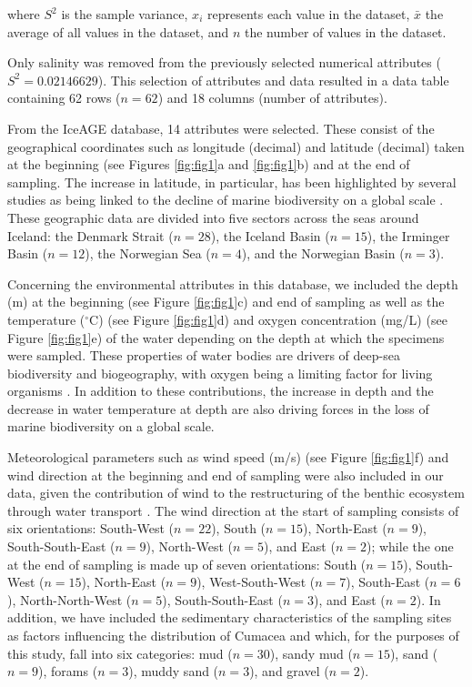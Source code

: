 where $S^2$ is the sample variance, $x_i$ represents each value in the dataset, $\bar{x}$ the average of all values in the dataset, and $n$ the number of values in the dataset.

Only salinity was removed from the previously selected numerical attributes ($S^2 = 0.02146629$). This selection of attributes and data resulted in a data table containing 62 rows ($n=62$) and 18 columns (number of attributes). 

From the IceAGE database, 14 attributes were selected. These consist of the geographical coordinates such as longitude (decimal) and latitude (decimal) taken at the beginning (see Figures \ref{fig:fig1}a and \ref{fig:fig1}b) and at the end of sampling. The increase in latitude, in particular, has been highlighted by several studies as being linked to the decline of marine biodiversity on a global scale \citep{lambshead_latitudinal_2000, gage_diversity_2004}. These geographic data are divided into five sectors across the seas around Iceland: the Denmark Strait ($n=28$), the Iceland Basin ($n=15$), the Irminger Basin ($n=12$), the Norwegian Sea ($n=4$), and the Norwegian Basin ($n=3$). 

Concerning the environmental attributes in this database, we included the depth (m) at the beginning (see Figure \ref{fig:fig1}c) and end of sampling as well as the temperature ($^\circ$C) (see Figure \ref{fig:fig1}d) and oxygen concentration (mg/L) (see Figure \ref{fig:fig1}e) of the water depending on the depth at which the specimens were sampled. These properties of water bodies are drivers of deep-sea biodiversity and biogeography, with oxygen being a limiting factor for living organisms \citep{keeling_ocean_2010}. In addition to these contributions, the increase in depth \citep{rex_global_2006,costello_marine_2017} and the decrease in water temperature at depth \citep{lambshead_latitudinal_2000} are also driving forces in the loss of marine biodiversity on a global scale.

Meteorological parameters such as wind speed (m/s) (see Figure \ref{fig:fig1}f) and wind direction at the beginning and end of sampling were also included in our data, given the contribution of wind to the restructuring of the benthic ecosystem through water transport \citep{waga_recent_2020,saeedi_environmental_2022}. The wind direction at the start of sampling consists of six orientations: South-West ($n=22$), South ($n=15$), North-East ($n=9$), South-South-East ($n=9$), North-West ($n=5$), and East ($n=2$); while the one at the end of sampling is made up of seven orientations: South ($n=15$), South-West ($n=15$), North-East ($n=9$), West-South-West ($n=7$), South-East ($n=6$), North-North-West ($n=5$), South-South-East ($n=3$), and East ($n=2$). In addition, we have included the sedimentary characteristics of the sampling sites as factors influencing the distribution of Cumacea \citep{uhlir_adding_2021} and which, for the purposes of this study, fall into six categories: mud ($n=30$), sandy mud ($n=15$), sand ($n=9$), forams ($n=3$), muddy sand ($n=3$), and gravel ($n=2$).

